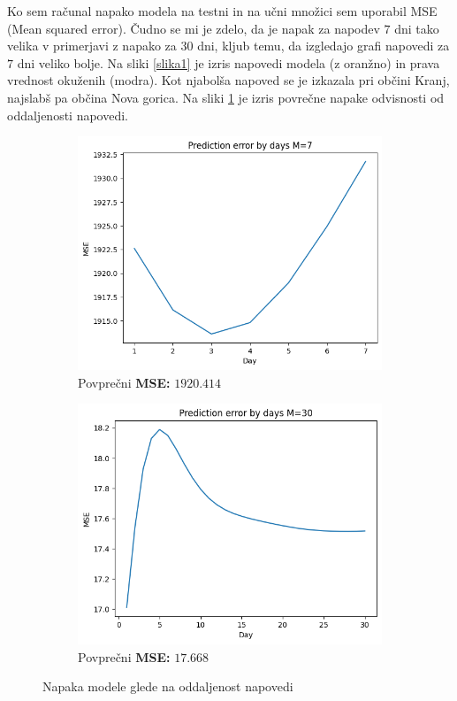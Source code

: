 \documentclass[12pt]{article}
\begin{document}
Ko sem računal napako modela na testni in na učni množici
sem uporabil MSE (Mean squared error).
Čudno se mi je zdelo, da je napak za napodev $7$ dni tako velika v primerjavi 
z napako za $30$ dni, kljub temu, da izgledajo grafi napovedi za $7$ dni  
veliko bolje. Na sliki \ref{slika1} je izris napovedi modela (z oranžno) in 
prava vrednost okuženih (modra). Kot njabolša napoved se je izkazala pri občini
Kranj, najslabš pa občina Nova gorica. Na sliki \ref{slika2} je izris 
povrečne napake odvisnosti od oddaljenosti napovedi.

\begin{figure}[htbp]
    \centering
    \begin{subfigure}[b]{0.49\textwidth}
        \centering
        \includegraphics[width=\textwidth]{Fig/daysM7.png}
        \caption{Povprečni \textbf{MSE:} $1920.414$}
    \end{subfigure}
    \hfill
    \begin{subfigure}[b]{0.49\textwidth}
        \centering
        \includegraphics[width=\textwidth]{Fig/daysM30.png}
        \caption{Povprečni \textbf{MSE:} $17.668$}
    \end{subfigure}
    \caption{Napaka modele glede na oddaljenost napovedi}
    \label{slika2}

  \end{figure}
\end{document}
